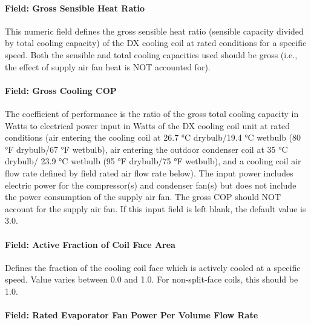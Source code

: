 \paragraph{Field: Gross Sensible Heat Ratio}\label{field-gross-sensible-heat-ratio}

This numeric field defines the gross sensible heat ratio (sensible capacity divided by total cooling capacity) of the DX cooling coil at rated conditions for a specific speed. Both the sensible and total cooling capacities used should be gross (i.e., the effect of supply air fan heat is NOT accounted for).

\paragraph{Field: Gross Cooling COP}\label{field-gross-rated-cooling-cop}

The coefficient of performance is the ratio of the gross total cooling capacity in Watts to electrical power input in Watts of the DX cooling coil unit at rated conditions (air entering the cooling coil at 26.7 °C drybulb/19.4 °C wetbulb (80 °F drybulb/67 °F wetbulb), air entering the outdoor condenser coil at 35 °C drybulb/ 23.9 °C wetbulb (95 °F drybulb/75 °F wetbulb), and a cooling coil air flow rate defined by field rated air flow rate below). The input power includes electric power for the compressor(s) and condenser fan(s) but does not include the power consumption of the supply air fan. The gross COP should NOT account for the supply air fan. If this input field is left blank, the default value is 3.0.

\paragraph{Field: Active Fraction of Coil Face Area}\label{field-active-fraction-of-coil-face-area}

Defines the fraction of the cooling coil face which is actively cooled at a specific speed. Value varies between 0.0 and 1.0. For non-split-face coils, this should be 1.0.

\paragraph{Field: Rated Evaporator Fan Power Per Volume Flow Rate}\label{field-rated-evaporator-fan-power-per-volume-flow-rate}

